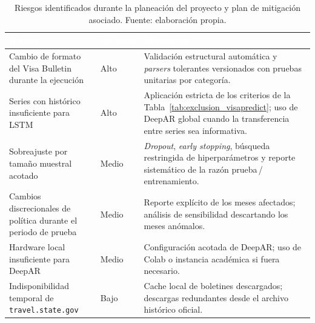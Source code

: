 \documentclass[12pt,letterpaper]{report}
\begin{document}
\begin{table}[H]
    \centering
    \footnotesize
    \setlength{\arrayrulewidth}{0.7pt}
    \setlength{\tabcolsep}{4pt}
    \begin{tabular}{>{\raggedright\arraybackslash}p{4.2cm}
                    >{\centering\arraybackslash}p{1.4cm}
                    >{\raggedright\arraybackslash}p{6.6cm}}
        \hline
        \rowcolor{uacjblue!85}
        \textcolor{white}{\textbf{Riesgo}} &
        \textcolor{white}{\textbf{Impacto}} &
        \textcolor{white}{\textbf{Mitigación}} \\
        \hline
        \rowcolor{uacjblue!4}
        Cambio de formato del Visa Bulletin durante la ejecución & Alto & Validación estructural automática y \textit{parsers} tolerantes versionados con pruebas unitarias por categoría. \\
        Series con histórico insuficiente para LSTM & Alto & Aplicación estricta de los criterios de la Tabla~\ref{tab:exclusion_visapredict}; uso de DeepAR global cuando la transferencia entre series sea informativa. \\
        \rowcolor{uacjblue!4}
        Sobreajuste por tamaño muestral acotado & Medio & \textit{Dropout}, \textit{early stopping}, búsqueda restringida de hiperparámetros y reporte sistemático de la razón prueba\,/\,entrenamiento. \\
        Cambios discrecionales de política durante el periodo de prueba & Medio & Reporte explícito de los meses afectados; análisis de sensibilidad descartando los meses anómalos. \\
        \rowcolor{uacjblue!4}
        Hardware local insuficiente para DeepAR & Medio & Configuración acotada de DeepAR; uso de Colab o instancia académica si fuera necesario. \\
        Indisponibilidad temporal de \texttt{travel.state.gov} & Bajo & Cache local de boletines descargados; descargas redundantes desde el archivo histórico oficial. \\
        \hline
    \end{tabular}
    \caption[Riesgos del proyecto y plan de mitigación.]{Riesgos identificados durante la planeación del proyecto y plan de mitigación asociado. Fuente: elaboración propia.}
    \label{tab:riesgos_visapredict}
\end{table}

\end{document}
